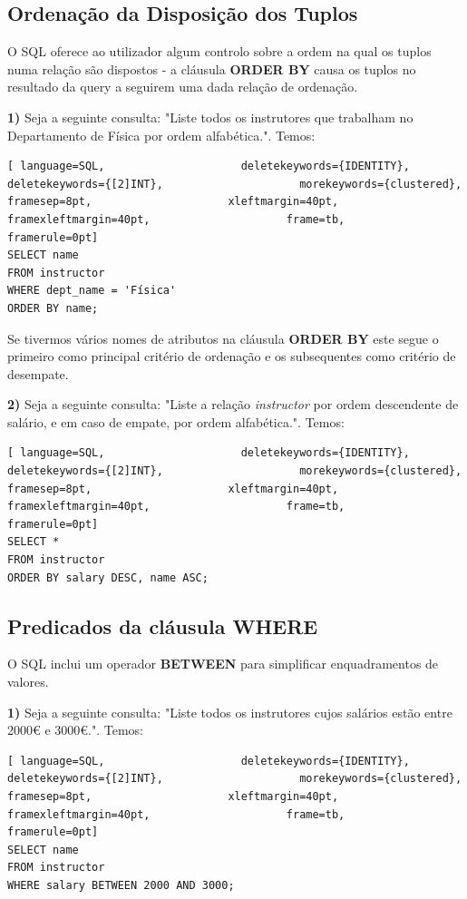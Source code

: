 \documentclass[oneside]{book}
\theoremstyle{definition}
\begin{document}
\subsection{Ordenação da Disposição dos Tuplos}
O SQL oferece ao utilizador algum controlo sobre a ordem na qual os tuplos numa relação são dispostos - a cláusula \textbf{ORDER BY} causa os tuplos no resultado da query a seguirem uma dada relação de ordenação. 

\textbf{1)} Seja a seguinte consulta: "Liste todos os instrutores que trabalham no Departamento de Física por ordem alfabética.". Temos:
\begin{lstlisting}[ language=SQL,                     deletekeywords={IDENTITY},                     deletekeywords={[2]INT},                     morekeywords={clustered},                     framesep=8pt,                     xleftmargin=40pt,                     framexleftmargin=40pt,                     frame=tb,                     framerule=0pt]
SELECT name
FROM instructor
WHERE dept_name = 'Física'
ORDER BY name;
\end{lstlisting}

Se tivermos vários nomes de atributos na cláusula \textbf{ORDER BY} este segue o primeiro como principal critério de ordenação e os subsequentes como critério de desempate.

\textbf{2)} Seja a seguinte consulta: "Liste a relação \textit{instructor} por ordem descendente de salário, e em caso de empate, por ordem alfabética.". Temos:
\begin{lstlisting}[ language=SQL,                     deletekeywords={IDENTITY},                     deletekeywords={[2]INT},                     morekeywords={clustered},                     framesep=8pt,                     xleftmargin=40pt,                     framexleftmargin=40pt,                     frame=tb,                     framerule=0pt]
SELECT *
FROM instructor
ORDER BY salary DESC, name ASC;
\end{lstlisting}

\subsection{Predicados da cláusula WHERE}
O SQL inclui um operador \textbf{BETWEEN} para simplificar enquadramentos de valores.

\textbf{1)} Seja a seguinte consulta: "Liste todos os instrutores cujos salários estão entre 2000€ e 3000€.". Temos:
\begin{lstlisting}[ language=SQL,                     deletekeywords={IDENTITY},                     deletekeywords={[2]INT},                     morekeywords={clustered},                     framesep=8pt,                     xleftmargin=40pt,                     framexleftmargin=40pt,                     frame=tb,                     framerule=0pt]
SELECT name
FROM instructor
WHERE salary BETWEEN 2000 AND 3000;
\end{lstlisting}
\end{document}
